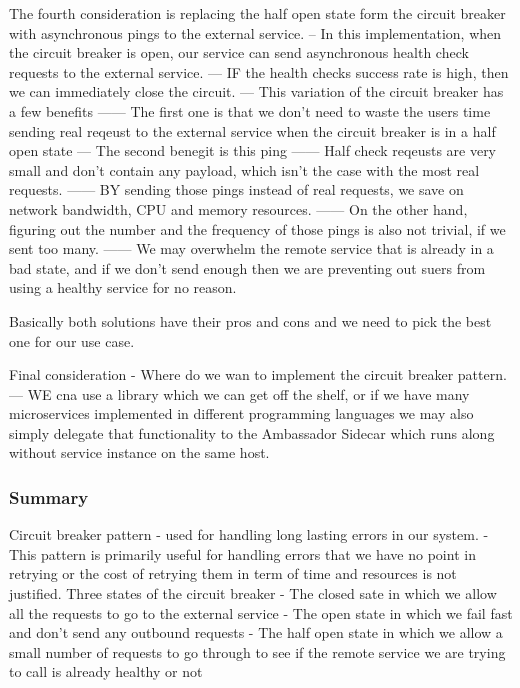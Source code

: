 \documentclass[a4paper, 11pt]{book}
\begin{document}
    The fourth consideration is replacing the half open state form the circuit breaker with asynchronous pings to the external service.
    -- In this implementation, when the circuit breaker is open, our service can send asynchronous health check requests to the external service.
    --- IF the health checks success rate is high, then we can immediately close the circuit.
    --- This variation of the circuit breaker has a few benefits
    ------ The first one is that we don't need to waste the users time sending real reqeust to the external service when the circuit breaker is in a half open state
    --- The second benegit is this ping
    ------ Half check reqeusts are very small and don't contain any payload, which isn't the case with the most real requests.
    ------ BY sending those pings instead of real requests, we save on network bandwidth, CPU and memory resources.
    ------ On the other hand, figuring out the number and the frequency of those pings is also not trivial, if we sent too many.
    ------ We may overwhelm the remote service that is already in a bad state, and if we don't send enough then we are preventing out suers from using a healthy service for no reason.

    Basically both solutions have their pros and cons and we need to pick the best one for our use case.

    Final consideration - Where do we wan to implement the circuit breaker pattern.
    --- WE cna use a library which we can get off the shelf, or if we have many microservices implemented in different programming languages we may also simply delegate that functionality to the Ambassador Sidecar which runs along without service instance on the same host.

    \subsubsection{Summary}
    Circuit breaker pattern - used for handling long lasting errors in our system.
    - This pattern is primarily useful for handling errors that we have no point in retrying or the cost of retrying them in term of time and resources is not justified.
    Three states of the circuit breaker
    - The closed sate in which we allow all the requests to go to the external service
    - The open state in which we fail fast and don't send any outbound requests
    - The half open state in which we allow a small number of requests to go through to see if the remote service we are trying to call is already healthy or not
\end{document}
